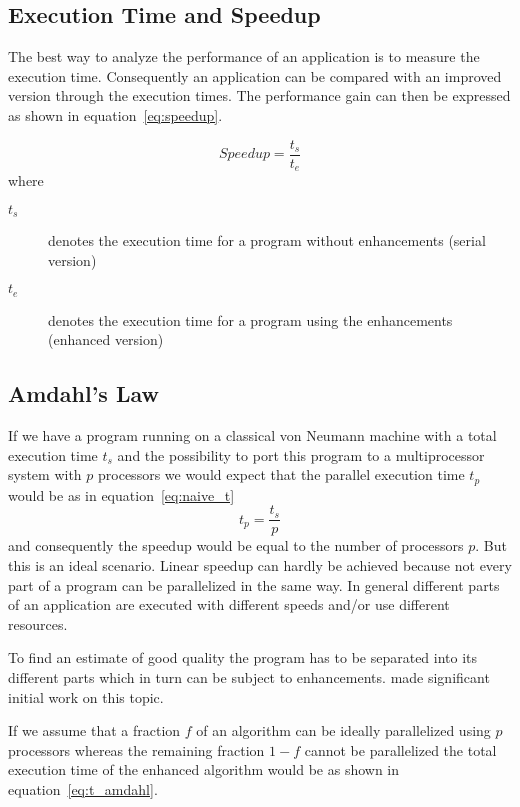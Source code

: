 \subsection{Execution Time and Speedup}
\label{sec:speedup}
The best way to analyze the performance of an application is to
measure the execution time. Consequently an application can be compared
with an improved version through the execution times.
The performance gain can then be expressed as shown in
equation~\ref{eq:speedup}. 

\begin{equation}
\label{eq:speedup}
Speedup = \frac{t_s}{t_e}
\end{equation}
where
\begin{description}
\item[$t_s$] denotes the execution time for a program without
  enhancements (serial version)
\item[$t_e$] denotes the execution time for a program using the
  enhancements (enhanced version)
\end{description}

\subsection{Amdahl's Law}

If we have a program running on a classical von Neumann machine with a
total execution time $t_s$ and the possibility to port this program to
a multiprocessor system with $p$ processors we would expect that the
parallel execution time $t_p$ would be as in equation~\ref{eq:naive_t}
\begin{equation}
\label{eq:naive_t}
t_p = \frac{t_s}{p}
\end{equation}
and consequently the speedup would be equal to the number of
processors $p$.
But this is an ideal scenario. Linear speedup can hardly be achieved
because not every part of a program can be parallelized in the same
way. In general different parts of an application are executed with
different speeds and/or use different resources.

To find an estimate of good quality the program has to be separated
into its different parts which in turn can be subject to
enhancements. \cite{amdahl67vsp} made significant initial work on this
topic.

If we assume that a fraction $f$ of an algorithm can be ideally
parallelized using $p$ processors whereas the remaining fraction $1 -
f$ cannot be 
parallelized the total execution time of the enhanced algorithm would
be as shown in equation~\ref{eq:t_amdahl}.

